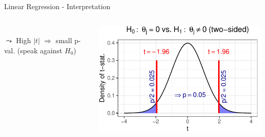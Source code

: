 \documentclass[10pt,compress,t,notes=noshow, xcolor=table]{beamer}
\begin{document}
\begin{frame}{Linear Regression - Interpretation}
{\begin{columns}[T, totalwidth=\textwidth]
\begin{column}{0.65\textwidth}
\begin{itemize}
        \\
        $\leadsto$ High $|t|$ $\Rightarrow$ small p-val. (speak against $H_0$)
    \end{itemize}
    \end{column}
    \begin{column}{0.35\textwidth}
        \includegraphics[width=\textwidth]{figure/p-value.pdf}
    \end{column}
    \end{columns}}
\end{frame}
\end{document}
